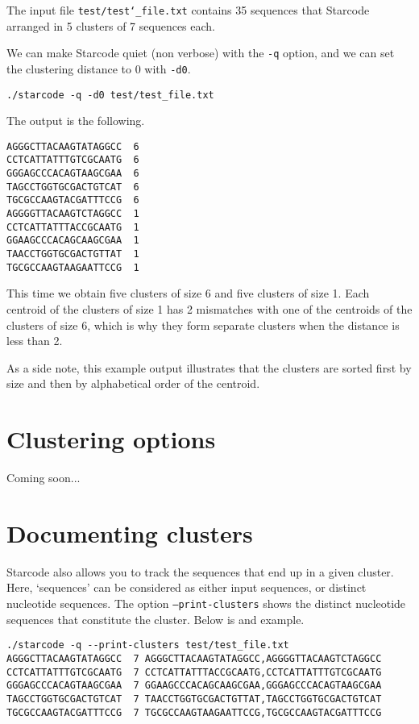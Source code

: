 \documentclass[12pt]{article}
\begin{document}
The input file \texttt{test/test\char`_file.txt} contains 35 sequences
that Starcode arranged in 5 clusters of 7 sequences each.


We can make Starcode quiet (non verbose) with the \texttt{-q} option,
and we can set the clustering distance to 0 with \texttt{-d0}.

\begin{verbatim}
./starcode -q -d0 test/test_file.txt
\end{verbatim}

The output is the following.

\begin{verbatim}
AGGGCTTACAAGTATAGGCC  6
CCTCATTATTTGTCGCAATG  6
GGGAGCCCACAGTAAGCGAA  6
TAGCCTGGTGCGACTGTCAT  6
TGCGCCAAGTACGATTTCCG  6
AGGGGTTACAAGTCTAGGCC  1
CCTCATTATTTACCGCAATG  1
GGAAGCCCACAGCAAGCGAA  1
TAACCTGGTGCGACTGTTAT  1
TGCGCCAAGTAAGAATTCCG  1
\end{verbatim}

This time we obtain five clusters of size 6 and five clusters of size 1.
Each centroid of the clusters of size 1 has 2 mismatches with one
of the centroids of the clusters of size 6, which is why they form
separate clusters when the distance is less than 2.

As a side note, this example output illustrates that the clusters
are sorted first by size and then by alphabetical order of the
centroid.

\section{Clustering options}

Coming soon...

\section{Documenting clusters}

Starcode also allows you to track the sequences that end up in a
given cluster. Here, `sequences' can be considered as either input
sequences, or distinct nucleotide sequences. The option
\texttt{--print-clusters} shows the distinct nucleotide sequences
that constitute the cluster. Below is and example.

\begin{verbatim}
./starcode -q --print-clusters test/test_file.txt
AGGGCTTACAAGTATAGGCC  7 AGGGCTTACAAGTATAGGCC,AGGGGTTACAAGTCTAGGCC
CCTCATTATTTGTCGCAATG  7 CCTCATTATTTACCGCAATG,CCTCATTATTTGTCGCAATG
GGGAGCCCACAGTAAGCGAA  7 GGAAGCCCACAGCAAGCGAA,GGGAGCCCACAGTAAGCGAA
TAGCCTGGTGCGACTGTCAT  7 TAACCTGGTGCGACTGTTAT,TAGCCTGGTGCGACTGTCAT
TGCGCCAAGTACGATTTCCG  7 TGCGCCAAGTAAGAATTCCG,TGCGCCAAGTACGATTTCCG
\end{verbatim}
\end{document}
